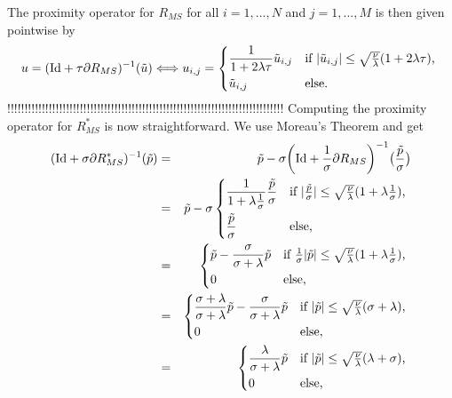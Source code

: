         The proximity operator for $R_{MS}$ for all $i = 1, ..., N$ and $j = 1, ..., M$ is then given pointwise by
            \begin{equation}
                u = (\textnormal{Id} + \tau \partial R_{MS})^{-1}(\tilde{u}) \Longleftrightarrow u_{i, j} = 
                    \begin{dcases*}
                        \frac{1}{1 + 2\lambda\tau}\tilde{u}_{i, j} & \textnormal{if $|\tilde{u}_{i, j}| \le \sqrt{\frac{\nu}{\lambda}}(1 + 2\lambda\tau)$,} \\
                        \tilde{u}_{i, j} & \textnormal{else.}
                    \end{dcases*}
            \label{eq:proximity_operator_r}
            \end{equation}
        !!!!!!!!!!!!!!!!!!!!!!!!!!!!!!!!!!!!!!!!!!!!!!!!!!!!!!!!!!!!!!!!!!!!!!!!!!!!!!!!
        Computing the proximity operator for $R_{MS}^{\ast}$ is now straightforward. We use Moreau's Theorem and get
            \begin{eqnarray}
                (\textnormal{Id} + \sigma \partial R_{MS}^{\ast})^{-1}(\tilde{p}) &=& \tilde{p} - \sigma \bigg(\textnormal{Id} + \frac{1}{\sigma} \partial R_{MS}\bigg)^{-1}\big(\frac{\tilde{p}}{\sigma}\big) \notag \\
                &=& \tilde{p} - \sigma
                    \begin{dcases*}
                        \frac{1}{1 + \lambda\frac{1}{\sigma}}\frac{\tilde{p}}{\sigma} & \textnormal{if $|\frac{\tilde{p}}{\sigma}| \le \sqrt{\frac{\nu}{\lambda}}(1 + \lambda\frac{1}{\sigma})$,} \\
                        \frac{\tilde{p}}{\sigma} & \textnormal{else,}
                    \end{dcases*} \notag \\
                &=& \begin{dcases*}
                        \tilde{p} - \frac{\sigma}{\sigma + \lambda}\tilde{p} & \textnormal{if $\frac{1}{\sigma}|\tilde{p}| \le \sqrt{\frac{\nu}{\lambda}}(1 + \lambda\frac{1}{\sigma})$,} \\
                        0 & \textnormal{else,}
                    \end{dcases*} \notag \\
                &=& \begin{dcases*}
                        \frac{\sigma + \lambda}{\sigma + \lambda}\tilde{p} - \frac{\sigma}{\sigma + \lambda}\tilde{p} & \textnormal{if $|\tilde{p}| \le \sqrt{\frac{\nu}{\lambda}}(\sigma + \lambda)$,} \\
                        0 & \textnormal{else,}
                    \end{dcases*} \notag \\
                &=& \begin{dcases*}
                        \frac{\lambda}{\sigma + \lambda}\tilde{p} & \textnormal{if $|\tilde{p}| \le \sqrt{\frac{\nu}{\lambda}}(\lambda + \sigma)$,} \\
                        0 & \textnormal{else,}
                    \end{dcases*} \notag
            \end{eqnarray}
